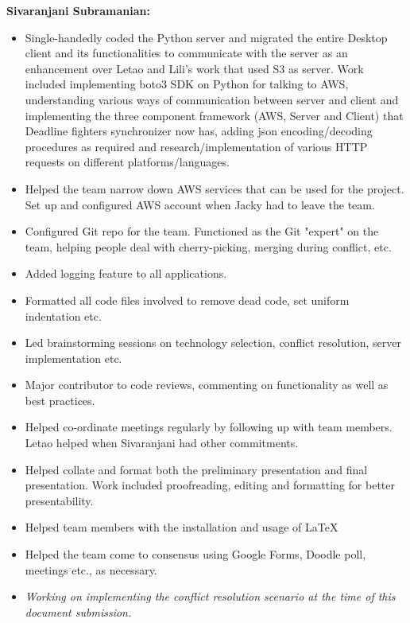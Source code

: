 \textbf{Sivaranjani Subramanian:}
\begin{itemize}
\item Single-handedly coded the Python server and migrated the entire Desktop client and its functionalities to communicate with the server as an enhancement over Letao and Lili's work that used S3 as server. Work included implementing boto3 SDK on Python for talking to AWS, understanding various ways of communication between server and client and implementing the three component framework (AWS, Server and Client) that Deadline fighters synchronizer now has, adding json encoding/decoding procedures as required and research/implementation of various HTTP requests on different platforms/languages.
\item Helped the team narrow down AWS services that can be used for the project. Set up and configured AWS account when Jacky had to leave the team.
\item Configured Git repo for the team. Functioned as the Git "expert" on the team, helping people deal with cherry-picking, merging during conflict, etc.
\item Added logging feature to all applications.
\item Formatted all code files involved to remove dead code, set uniform indentation etc.
\item Led brainstorming sessions on technology selection, conflict resolution, server implementation etc.
\item Major contributor to code reviews, commenting on functionality as well as best practices.
\item Helped co-ordinate meetings regularly by following up with team members. Letao helped when Sivaranjani had other commitments.
\item Helped collate and format both the preliminary presentation and final presentation. Work included proofreading, editing and formatting for better presentability.
\item Helped team members with the installation and usage of \LaTeX
\item Helped the team come to consensus using Google Forms, Doodle poll, meetings etc., as necessary.
\item \emph{Working on implementing the conflict resolution scenario at the time of this document submission.}
\end{itemize}


